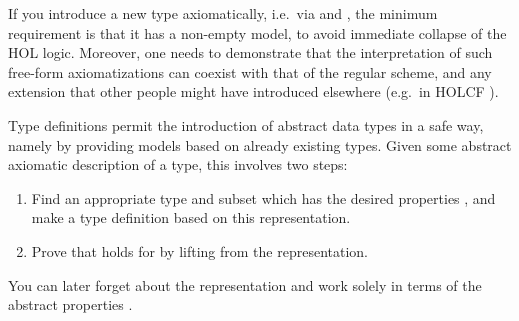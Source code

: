 \begin{isabellebody}
\begin{isamarkuptext}
\begin{description}
  \end{description}

  \begin{warn}
  If you introduce a new type axiomatically, i.e.\ via \hyperlink{command.typedecl}{\mbox{}} and \hyperlink{command.axiomatization}{\mbox{}}, the minimum requirement
  is that it has a non-empty model, to avoid immediate collapse of the
  HOL logic.  Moreover, one needs to demonstrate that the
  interpretation of such free-form axiomatizations can coexist with
  that of the regular \hypertarget{command.typedef}{\hyperlink{command.typedef}{\mbox{}}} scheme, and any extension
  that other people might have introduced elsewhere (e.g.\ in HOLCF
  \cite{MuellerNvOS99}).
  \end{warn}%
\end{isamarkuptext}%
\isamarkuptrue%
%
\isamarkuptrue%
%
\begin{isamarkuptext}%
Type definitions permit the introduction of abstract data
  types in a safe way, namely by providing models based on already
  existing types.  Given some abstract axiomatic description 
  of a type, this involves two steps:

  \begin{enumerate}

  \item Find an appropriate type  and subset  which
  has the desired properties , and make a type definition
  based on this representation.

  \item Prove that  holds for  by lifting 
  from the representation.

  \end{enumerate}

  You can later forget about the representation and work solely in
  terms of the abstract properties .


\end{isamarkuptext}
\end{isabellebody}
